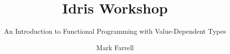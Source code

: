 \title{Idris Workshop}
\subtitle{\small{An Introduction to Functional Programming with Value-Dependent Types}}
\author{Mark Farrell}


